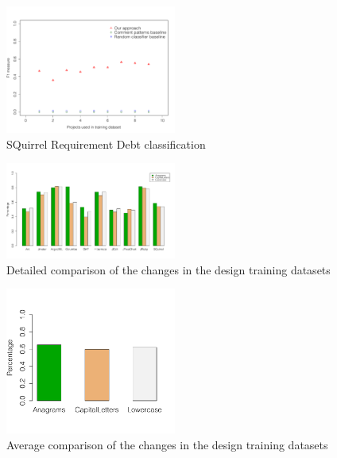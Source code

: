 \begin{figure}[thb!]
  \centering
  \includegraphics[width=0.50\textwidth]{figures/appendix/iteration_details/implementation_sql12.pdf}
  \vspace{-3mm}
  \caption{SQuirrel Requirement Debt classification}
  \label{fig:implementation_sql}
\end{figure}

\clearpage

\begin{figure}[thb!]
  \centering
  \includegraphics[width=0.50\textwidth]{figures/appendix/detailed_comparison_design_training_dataset.pdf}
  \vspace{-3mm}
  \caption{Detailed comparison of the changes in the design training datasets}
  \label{fig:detailed_comparison_design_training_dataset}
\end{figure}

\begin{figure}[thb!]
  \centering
  \includegraphics[width=0.50\textwidth]{figures/appendix/average_comparison_design_training_dataset.pdf}
  \vspace{-3mm}
  \caption{Average comparison of the changes in the design training datasets}
  \label{fig:average_comparison_design_training_dataset}
\end{figure}

